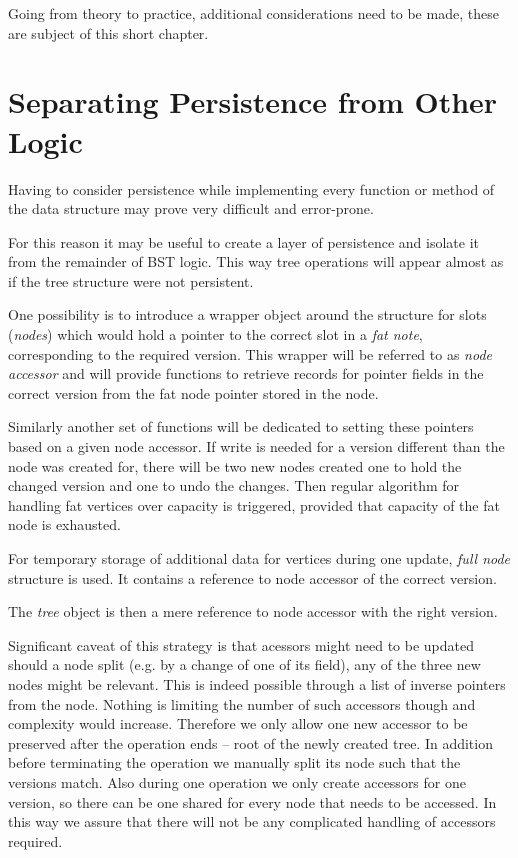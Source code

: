 Going from theory to practice, additional considerations need to be made, these are subject of this short chapter.

\section{Separating Persistence from Other Logic}

Having to consider persistence while implementing every function or method of the data structure may prove very difficult and error-prone.

For this reason it may be useful to create a layer of persistence and isolate it from the remainder of BST logic. 
This way tree operations will appear almost as if the tree structure were not persistent.

One possibility is to introduce a wrapper object around the structure for slots (\emph{nodes}) which would hold a pointer to the correct slot in a \emph{fat note}, corresponding to the required version. 
This wrapper will be referred to as \emph{node accessor} and will provide functions to retrieve records for pointer fields in the correct version from the fat node pointer stored in the node. 

Similarly another set of functions will be dedicated to setting these pointers based on a given node accessor. 
If write is needed for a version different than the node was created for, there will be two new nodes created one to hold the changed version and one to undo the changes. 
Then regular algorithm for handling fat vertices over capacity is triggered, provided that capacity of the fat node is exhausted.

For temporary storage of additional data for vertices during one update, \emph{full node} structure is used. It contains a reference to node accessor of the correct version.

The \emph{tree} object is then a mere reference to node accessor with the right version.

Significant caveat of this strategy is that acessors might need to be updated should a node split (e.g. by a change of one of its field), any of the three new nodes might be relevant. 
This is indeed possible through a list of inverse pointers from the node. Nothing is limiting the number of such accessors though and complexity would increase. 
Therefore we only allow one new accessor to be preserved after the operation ends -- root of the newly created tree. 
In addition before terminating the operation we manually split its node such that the versions match. 
Also during one operation we only create accessors for one version, so there can be one shared for every node that needs to be accessed. 
In this way we assure that there will not be any complicated handling of accessors required. 


